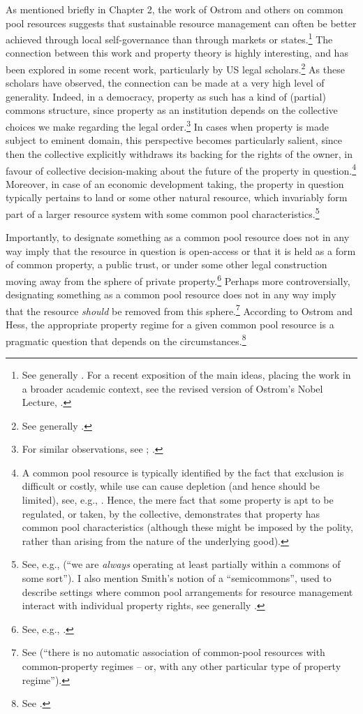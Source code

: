 As mentioned briefly in Chapter 2, the work of Ostrom and others on common pool resources suggests that sustainable resource management can often be better achieved through local self-governance than through markets or states.\footnote{See generally \cite{ostrom90}. For a recent exposition of the main ideas, placing the work in a broader academic context, see the revised version of Ostrom's Nobel Lecture, \cite{ostrom10}.} The connection between this work and property theory is highly interesting, and has been explored in some recent work, particularly by US legal scholars.\footnote{See generally \cite{rose11,fennel11}.} As these scholars have observed, the connection can be made at a very high level of generality. Indeed, in a democracy, property as such has a kind of (partial) commons structure, since property as an institution depends on the collective choices we make regarding the legal order.\footnote{For similar observations, see \cite[51]{rose90}; \cite[577]{heller01}.} In cases when property is made subject to eminent domain, this perspective becomes particularly salient, since then the collective explicitly withdraws its backing for the rights of the owner, in favour of collective decision-making about the future of the property in question.\footnote{A common pool resource is typically identified by the fact that exclusion is difficult or costly, while use can cause depletion (and hence should be limited), see, e.g., \cite[57]{ostrom10b}. Hence, the mere fact that some property is apt to be regulated, or taken, by the collective, demonstrates that property has common pool characteristics (although these might be imposed by the polity, rather than arising from the nature of the underlying good).} Moreover, in case of an economic development taking, the property in question typically pertains to land or some other natural resource, which invariably form part of a larger resource system with some common pool characteristics.\footnote{See, e.g., \cite[16]{fennel11} (``we are {\it always} operating at least partially within a commons of some sort''). I also mention Smith's notion of a ``semicommons'', used to describe settings where common pool arrangements for resource management interact with individual property rights, see generally \cite{smith00,smith02}.}

Importantly, to designate something as a common pool resource does not in any way imply that the resource in question is open-access or that it is held as a form of common property, a public trust, or under some other legal construction moving away from the sphere of private property.\footnote{See, e.g., \cite[58]{ostrom10b}.} Perhaps more controversially, designating something as a common pool resource does not in any way imply that the resource {\it should} be removed from this sphere.\footnote{See \cite[58]{ostrom10b} (``there is no automatic association of common-pool resources with common-property regimes -- or, with any other particular type of property regime'').} According to Ostrom and Hess, the appropriate property regime for a given common pool resource is a pragmatic question that depends on the circumstances.\footnote{See \cite[58]{ostrom10b}.}

